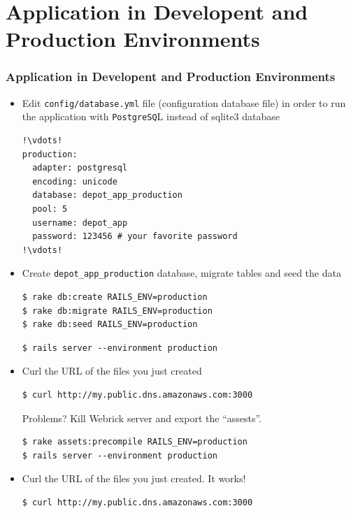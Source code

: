 \documentclass{beamer}
\begin{document}
\section{Application in Developent and Production Environments}
\begin{frame}
\frametitle{Application in Developent and Production Environments}
\begin{itemize}
\item Edit \texttt{config/database.yml} file (configuration database file) in order to run the application with \texttt{PostgreSQ}L instead of sqlite3 database

\lstset{language=Ruby, style=eclipse, numbers=left}
\begin{lstlisting}[escapechar=!]
!\vdots!
production:
  adapter: postgresql
  encoding: unicode
  database: depot_app_production
  pool: 5
  username: depot_app
  password: 123456 # your favorite password
!\vdots!
\end{lstlisting}

\item Create \texttt{depot\_app\_production} database, migrate tables and  seed the data

\lstset{language=shell, style=eclipse}
\begin{lstlisting}[numbers=none, escapechar=!]
$ rake db:create RAILS_ENV=production
$ rake db:migrate RAILS_ENV=production
$ rake db:seed RAILS_ENV=production
\end{lstlisting}

\lstset{language=shell, style=eclipse}
\begin{lstlisting}[escapechar=!]
$ rails server --environment production
\end{lstlisting}

\item Curl the URL of the files you just created

\lstset{language=shell, style=eclipse}
\begin{lstlisting}[escapechar=!]
$ curl http://my.public.dns.amazonaws.com:3000
\end{lstlisting}

Problems? Kill Webrick server and export the ``assests''. 

\lstset{language=shell, style=eclipse}
\begin{lstlisting}[escapechar=!]
$ rake assets:precompile RAILS_ENV=production
$ rails server --environment production
\end{lstlisting}

\item Curl the URL of the files you just created. It works!
\lstset{language=shell, style=eclipse}
\begin{lstlisting}[escapechar=!]
$ curl http://my.public.dns.amazonaws.com:3000
\end{lstlisting}
\end{itemize}

\end{frame}
\end{document}
